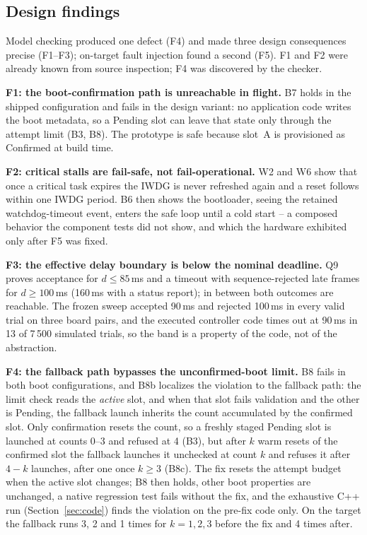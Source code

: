 \documentclass[conference,a4paper]{IEEEtran}
\begin{document}
\subsection{Design findings}
\label{sec:findings}
Model checking produced one defect (F4) and made three design consequences precise (F1--F3); on-target fault injection found a second (F5). F1 and F2 were already known from source inspection; F4 was discovered by the checker.

\textbf{F1: the boot-confirmation path is unreachable in flight.} B7 holds in the shipped configuration and fails in the design variant: no application code writes the boot metadata, so a Pending slot can leave that state only through the attempt limit (B3, B8). The prototype is safe because slot~A is provisioned as Confirmed at build time.

\textbf{F2: critical stalls are fail-safe, not fail-operational.} W2 and W6 show that once a critical task expires the IWDG is never refreshed again and a reset follows within one IWDG period. B6 then shows the bootloader, seeing the retained watchdog-timeout event, enters the safe loop until a cold start -- a composed behavior the component tests did not show, and which the hardware exhibited only after F5 was fixed.

\textbf{F3: the effective delay boundary is below the nominal deadline.} Q9 proves acceptance for $d\le 85$\,ms and a timeout with sequence-rejected late frames for $d\ge100$\,ms (160\,ms with a status report); in between both outcomes are reachable. The frozen sweep accepted 90\,ms and rejected 100\,ms in every valid trial on three board pairs, and the executed controller code times out at 90\,ms in 13 of 7\,500 simulated trials, so the band is a property of the code, not of the abstraction.

\textbf{F4: the fallback path bypasses the unconfirmed-boot limit.} B8 fails in both boot configurations, and B8b localizes the violation to the fallback path: the limit check reads the \emph{active} slot, and when that slot fails validation and the other is Pending, the fallback launch inherits the count accumulated by the confirmed slot. Only confirmation resets the count, so a freshly staged Pending slot is launched at counts 0--3 and refused at 4 (B3), but after $k$ warm resets of the confirmed slot the fallback launches it unchecked at count $k$ and refuses it after $4-k$ launches, after one once $k\ge3$ (B8c). The fix resets the attempt budget when the active slot changes; B8 then holds, other boot properties are unchanged, a native regression test fails without the fix, and the exhaustive C++ run (Section~\ref{sec:code}) finds the violation on the pre-fix code only. On the target the fallback runs 3, 2 and 1 times for $k=1,2,3$ before the fix and 4 times after.
\end{document}

